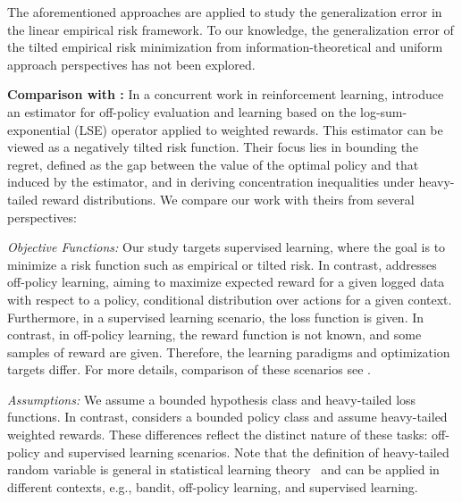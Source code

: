 \documentclass{article}
\theoremstyle{plain}
\theoremstyle{plain}
\theoremstyle{definition}
\theoremstyle{remark}
\begin{document}
 The aforementioned approaches are applied to study the generalization error in the linear empirical risk framework. To %
our knowledge, the generalization error of the tilted empirical risk minimization from information-theoretical and uniform approach perspectives has not been explored.

\textbf{Comparison with \citet{behnamnialog}:} In a concurrent work in reinforcement learning, \citet{behnamnialog} introduce an estimator for off-policy evaluation and learning based on the log-sum-exponential (LSE) operator applied to weighted rewards. This estimator can be viewed as a negatively tilted risk function. Their focus lies in bounding the regret, defined as the gap between the value of the optimal policy and that induced by the estimator, and in deriving concentration inequalities under heavy-tailed reward distributions. We compare our work with theirs from several perspectives:

\textit{Objective Functions:} Our study targets supervised learning, where the goal is to minimize a risk function such as empirical or tilted risk. In contrast, \citet{behnamnialog} addresses off-policy learning, aiming to maximize expected reward for a given logged data with respect to a policy, conditional distribution over actions for a given context. Furthermore, in a supervised learning scenario, the loss function is given. In contrast, in off-policy learning, the reward function is not known, and some samples of reward are given. Therefore, the learning paradigms and optimization targets differ. For more details, comparison of these scenarios see \citep[Table~1]{swaminathan2015batch}.

\textit{Assumptions:} We assume a bounded hypothesis class and heavy-tailed loss functions. In contrast, \citep[Assumption~5.1]{behnamnialog} considers a bounded policy class and assume heavy-tailed weighted rewards. These differences reflect the distinct nature of these tasks: off-policy and supervised learning scenarios.  Note that the definition of heavy-tailed random variable is general in statistical learning theory~\citep{resnick2007heavy} and can be applied in different contexts, e.g., bandit, off-policy learning, and supervised learning.
\end{document}
